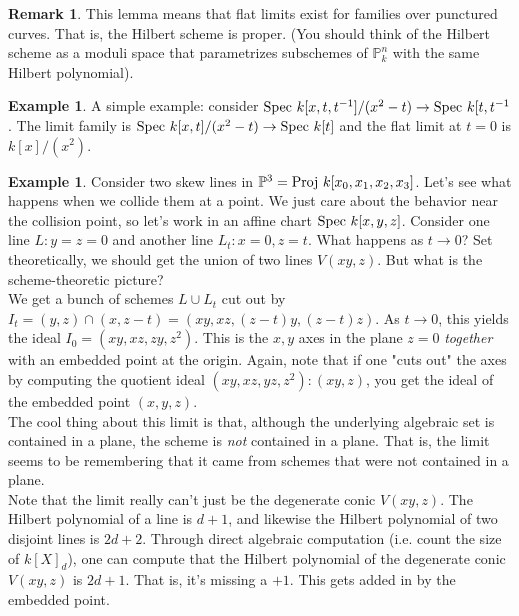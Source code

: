 \documentclass[10pt,reqno]{amsart}
\theoremstyle{definition}
\newtheorem{example}[theorem]{Example}
\newtheorem{remark}[theorem]{Remark}
\theoremstyle{remark}
\numberwithin{equation}{section}
\numberwithin{theorem}{section}
\newcommand{\spec}{\textup{Spec }}
\newcommand{\proj}{\textup{Proj }}
\newcommand{\PP}{{\mathbb P}}
\begin{document}
\begin{remark} This lemma means that flat limits exist for families over punctured curves. That is, the Hilbert scheme is proper. (You should think of the Hilbert scheme as a moduli space that parametrizes subschemes of $\PP^n_k$ with the same Hilbert polynomial).
\end{remark}

\begin{example} A simple example: consider $\spec k[x,t,t^{-1}]/(x^2-t) \to \spec k[t,t^{-1}$. The limit family is $\spec k[x,t]/(x^2-t) \to \spec k[t]$ and the flat limit at $t=0$ is  $k[x]/(x^2)$.
\end{example}

\begin{example} Consider two skew lines in $\PP^3 = \proj k[x_0,x_1,x_2,x_3]$. Let's see what happens when we collide them at a point. We just care about the behavior near the collision point, so let's work in an affine chart $\spec k[x,y,z]$. Consider one line $L: y=z=0$ and another line $L_t: x=0,z=t$. What happens as $t \to 0$? Set theoretically, we should get the union of two lines $V(xy,z)$. But what is the scheme-theoretic picture?
\\

We get a bunch of schemes $L \cup L_t$ cut out by $I_t = (y,z) \cap (x,z-t) = (xy,xz,(z-t)y,(z-t)z)$. As $t \to 0$, this yields the ideal $I_0 = (xy,xz,zy,z^2)$. This is the $x,y$ axes in the plane $z=0$ \textit{together} with an embedded point at the origin. Again, note that if one "cuts out" the axes by computing the quotient ideal $(xy,xz,yz,z^2):(xy,z)$, you get the ideal of the embedded point $(x,y,z)$.
\\

The cool thing about this limit is that, although the underlying algebraic set is contained in a plane, the scheme is \textit{not} contained in a plane. That is, the limit seems to be remembering that it came from schemes that were not contained in a plane. 
\\

Note that the limit really can't just be the degenerate conic $V(xy,z)$. The Hilbert polynomial of a line is $d+1$, and likewise the Hilbert polynomial of two disjoint lines is $2d+2$. Through direct algebraic computation (i.e. count the size of $k[X]_d$), one can compute that the Hilbert polynomial of the degenerate conic $V(xy,z)$ is $2d+1$. That is, it's missing a $+1$. This gets added in by the embedded point.
\end{example}
\end{document}
